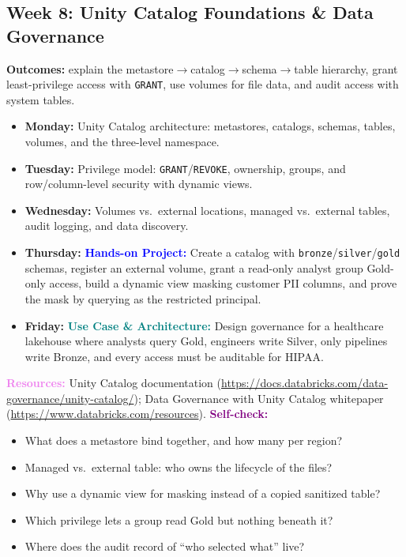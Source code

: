 \documentclass[11pt, a4paper]{article}
\newcommand{\project}[1]{\vspace{1mm}\noindent\textbf{\textcolor{blue}{Hands-on Project:}} #1}
\newcommand{\usecase}[1]{\vspace{1mm}\noindent\textbf{\textcolor{teal}{Use Case \& Architecture:}} #1}
\newcommand{\dayitem}[2]{\item \textbf{#1:} #2}
\newcommand{\resources}[1]{\vspace{1mm}\noindent\textbf{\textcolor{violet}{Resources:}} #1}
\newcommand{\selfcheck}[1]{\vspace{1mm}\noindent\textbf{\textcolor{purple}{Self-check:}} #1}
\begin{document}
\subsection*{Week 8: Unity Catalog Foundations \& Data Governance}
\par\noindent\textbf{Outcomes:} explain the metastore$\rightarrow$catalog$\rightarrow$schema$\rightarrow$table hierarchy, grant least-privilege access with \texttt{GRANT}, use volumes for file data, and audit access with system tables.
\begin{itemize}[label=-]
    \dayitem{Monday}{Unity Catalog architecture: metastores, catalogs, schemas, tables, volumes, and the three-level namespace.}
    \dayitem{Tuesday}{Privilege model: \texttt{GRANT}/\texttt{REVOKE}, ownership, groups, and row/column-level security with dynamic views.}
    \dayitem{Wednesday}{Volumes vs.\ external locations, managed vs.\ external tables, audit logging, and data discovery.}
    \dayitem{Thursday}{\project{Create a catalog with \texttt{bronze}/\texttt{silver}/\texttt{gold} schemas, register an external volume, grant a read-only analyst group Gold-only access, build a dynamic view masking customer PII columns, and prove the mask by querying as the restricted principal.}}
    \dayitem{Friday}{\usecase{Design governance for a healthcare lakehouse where analysts query Gold, engineers write Silver, only pipelines write Bronze, and every access must be auditable for HIPAA.}}
\end{itemize}
\resources{Unity Catalog documentation (\url{https://docs.databricks.com/data-governance/unity-catalog/}); Data Governance with Unity Catalog whitepaper (\url{https://www.databricks.com/resources}).}
\selfcheck{\begin{itemize}[label=-, leftmargin=1.5em, itemsep=0pt]
    \item What does a metastore bind together, and how many per region?
    \item Managed vs.\ external table: who owns the lifecycle of the files?
    \item Why use a dynamic view for masking instead of a copied sanitized table?
    \item Which privilege lets a group read Gold but nothing beneath it?
    \item Where does the audit record of ``who selected what'' live?
\end{itemize}}
\end{document}
